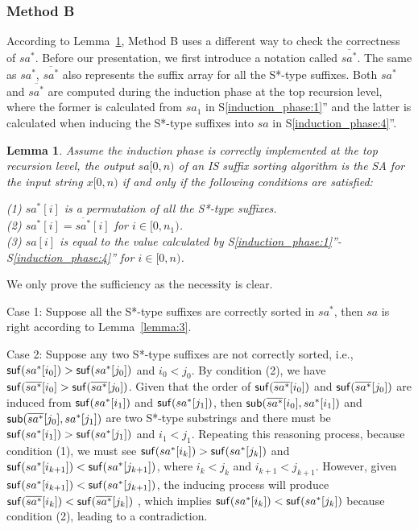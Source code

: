 \documentclass[10pt,journal,compsoc]{IEEEtran}
\newtheorem{lemma}[theorem]{Lemma}
\begin{document}
\subsubsection{Method B}\label{sec:proposals:method_b}

According to Lemma~\ref{lemma:4}, Method B uses a different way to check the correctness of $sa^*$. Before our presentation, we first introduce a notation called $\overline{sa^*}$. The same as $sa^*$, $\overline{sa^*}$ also represents the suffix array for all the S*-type suffixes. Both $sa^*$ and $\overline{sa^*}$ are computed during the induction phase at the top recursion level, where the former is calculated from $sa_1$ in S\ref{induction_phase:1}'' and the latter is calculated when inducing the S*-type suffixes into $sa$ in S\ref{induction_phase:4}''. 

\begin{lemma} \label{lemma:4}
    Assume the induction phase is correctly implemented at the top recursion level, the output $sa[0, n)$ of an IS suffix sorting algorithm is the SA for the input string $x[0, n)$ if and only if the following conditions are satisfied:

	(1) $sa^*[i]$ is a permutation of all the S*-type suffixes. \\
	(2) $sa^*[i] = \overline{sa^*}[i]$ for $i \in [0, n_1)$. \\
	(3) $sa[i]$ is equal to the value calculated by S\ref{induction_phase:1}''-S\ref{induction_phase:4}'' for $i \in [0, n)$. \\

\end{lemma}

\begin{IEEEproof}

    We only prove the sufficiency as the necessity is clear.

    Case 1: Suppose all the S*-type suffixes are correctly sorted in $sa^*$, then $sa$ is right according to Lemma~\ref{lemma:3}.

    Case 2: Suppose any two S*-type suffixes are not correctly sorted, i.e., ${\sf suf}(sa^*[i_0]) > {\sf suf}(sa^*[j_0])$ and $i_0 < j_0$. By condition (2), we have ${\sf suf}(\overline{sa^*}[i_0] > {\sf suf}(\overline{sa^*}[j_0])$. Given that the order of ${\sf suf}(\overline{sa^*}[i_0])$ and ${\sf suf}(\overline{sa^*}[j_0])$ are induced from ${\sf suf}(sa^*[i_1])$ and ${\sf suf}(sa^*[j_1])$, then ${\sf sub}(\overline{sa^*}[i_0], sa^*[i_1])$ and ${\sf sub}(\overline{sa^*}[j_0], sa^*[j_1])$ are two S*-type substrings and there must be ${\sf suf}(sa^*[i_1])>{\sf suf}(sa^*[j_1])$ and $i_1 < j_1$. Repeating this reasoning process, because condition (1), we must see ${\sf suf}(sa^*[i_k])>{\sf suf}(sa^*[j_k])$ and ${\sf suf}(sa^*[i_{k+1}])<{\sf suf}(sa^*[j_{k+1}])$, where $i_k < j_k$ and $i_{k+1} < j_{k+1}$. However, given ${\sf suf}(sa^*[i_{k+1}])<{\sf suf}(sa^*[j_{k+1}])$, the inducing process will produce ${\sf suf}(\overline{sa^*}[i_k])<{\sf suf}(\overline{sa^*}[j_k])$ , which implies ${\sf suf}(sa^*[i_k])<{\sf suf}(sa^*[j_k])$ because condition (2), leading to a contradiction.
	
\end{IEEEproof}
	
\end{document}
